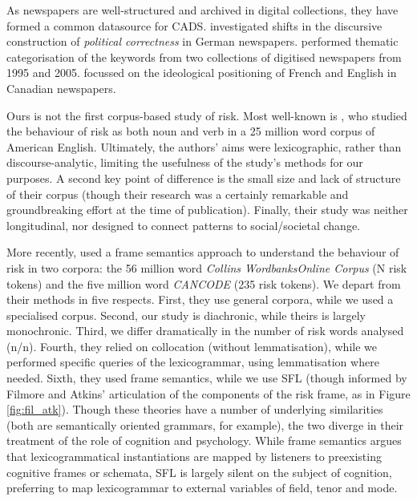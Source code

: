 		\noindent As newspapers are well-structured and archived in digital collections, they have formed a common datasource for CADS.  investigated shifts in the discursive construction of \emph{political correctness} in German newspapers.  performed thematic categorisation of the keywords from two collections of digitised newspapers from 1995 and 2005.  focussed on the ideological positioning of French and English in Canadian newspapers. %

		Ours is not the first corpus-based study of risk. Most well-known is , who studied the behaviour of risk as both noun and verb in a 25 million word corpus of American English. Ultimately, the authors' aims were lexicographic, rather than discourse-analytic, limiting the usefulness of the study's methods for our purposes. A second key point of difference is the small size and lack of structure of their corpus (though their research was a certainly remarkable and groundbreaking effort at the time of publication). Finally, their study was neither longitudinal, nor designed to connect patterns to social/societal change.

		More recently,  used a frame semantics approach to understand the behaviour of risk in two corpora: the 56 million word \emph{Collins WordbanksOnline Corpus} (N risk tokens) and the five million word \emph{CANCODE} (235 risk tokens). 
		We depart from their methods in five respects. First, they use general corpora, while we used a specialised corpus. Second, our study is diachronic, while theirs is largely monochronic. Third, we differ dramatically in the number of risk words analysed (n/n). Fourth, they relied on collocation (without lemmatisation), while we performed specific queries of the lexicogrammar, using lemmatisation where needed. Sixth, they used frame semantics, while we use SFL (though informed by Filmore and Atkins' \citeyear{fillmore_toward_1992} articulation of the components of the risk frame, as in Figure \ref{fig:fil_atk}). Though these theories have a number of underlying similarities (both are semantically oriented grammars, for example), the two diverge in their treatment of the role of cognition and psychology. While frame semantics argues that lexicogrammatical instantiations are mapped by listeners to preexisting cognitive frames or schemata, SFL is largely silent on the subject of cognition, preferring to map lexicogrammar to external variables of field, tenor and mode.

